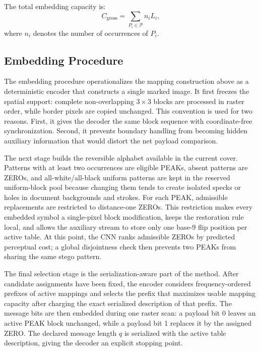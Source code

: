 \documentclass[a4paper,fleqn]{cas-dc}
\newcommand{\RevisionAddBegin}{\begingroup\color{revisionblue}}
\begin{document}
The total embedding capacity is:
\begin{equation}
C_{\text{gross}} = \sum_{P_i \in \mathcal{P}} n_i L_i,
\label{eq:gross-capacity}
\end{equation}
where $n_i$ denotes the number of occurrences of $P_i$.

\subsection{Embedding Procedure}
\RevisionAddBegin
The embedding procedure operationalizes the mapping construction above as a
deterministic encoder that constructs a single marked image. It first freezes
the spatial support: complete non-overlapping $3\times3$ blocks are processed
in raster order, while border pixels are copied unchanged.
This convention is used for two reasons. First, it gives the decoder the same
block sequence with coordinate-free synchronization. Second, it prevents boundary
handling from becoming hidden auxiliary information that would distort the net
payload comparison.

The next stage builds the reversible alphabet available in the current cover.
Patterns with at least two occurrences are eligible PEAKs, absent patterns are
ZEROs, and all-white/all-black uniform patterns are kept in the reserved
uniform-block pool because changing them tends to create isolated specks or holes in
document backgrounds and strokes. For each PEAK, admissible replacements are
restricted to distance-one ZEROs. This restriction makes every embedded symbol a
single-pixel block modification, keeps the restoration rule local, and allows
the auxiliary stream to store only one base-9 flip position per active table.
At this point, the CNN ranks admissible ZEROs by predicted perceptual cost;
a global disjointness check then prevents two PEAKs from sharing the same
stego pattern.

The final selection stage is the serialization-aware part of the method. After
candidate assignments have been fixed, the encoder considers frequency-ordered
prefixes of active mappings and selects the prefix that maximizes usable mapping capacity
after charging the exact serialized description of that prefix. The message bits
are then embedded during one raster scan: a payload bit 0 leaves an active PEAK
block unchanged, while a payload bit 1 replaces it by the assigned ZERO. The
declared message length $q$ is serialized with the active table description,
giving the decoder an explicit stopping point.
\end{document}
